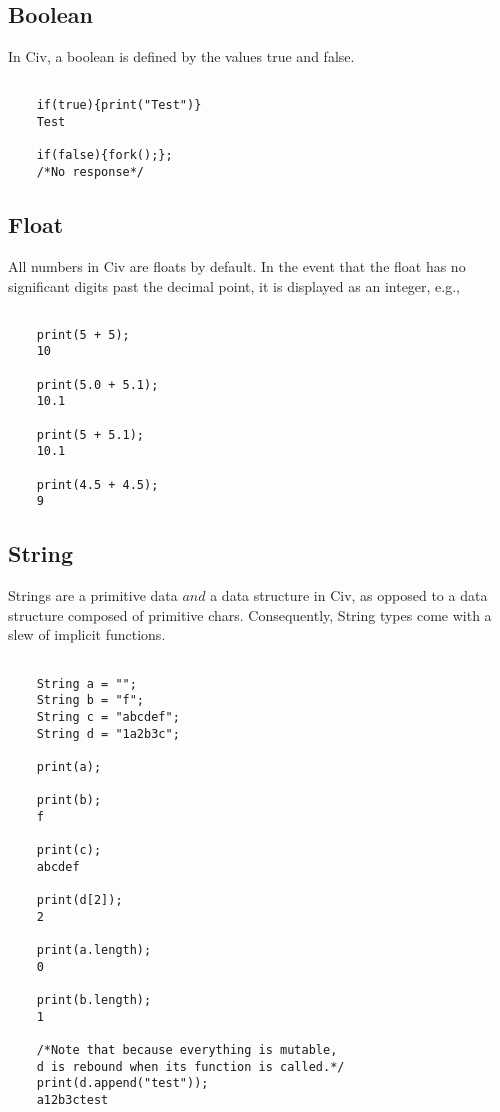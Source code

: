 \documentclass[a4paper]{article}
\begin{document}
\subsection{Boolean}
In Civ, a boolean is defined by the values {\selectfont true} and {\selectfont false}. 

{\selectfont
\begin{lstlisting} 
    
    if(true){print("Test")}
    Test
        
    if(false){fork();};
    /*No response*/

\end{lstlisting}
}

\subsection{Float}
All numbers in Civ are floats by default. In the event that the float has no significant digits past the decimal point, it is displayed as an integer, e.g.,

{\selectfont
\begin{lstlisting} 

    print(5 + 5);
    10
    
    print(5.0 + 5.1);
    10.1
    
    print(5 + 5.1);
    10.1
    
    print(4.5 + 4.5);
    9

\end{lstlisting}
}

\subsection{String}
Strings are a primitive data $and$ a data structure in Civ, as opposed to a data structure composed of primitive chars. Consequently, String types come with a slew of implicit functions.

{\selectfont
\begin{lstlisting}

    String a = "";
    String b = "f";
    String c = "abcdef";
    String d = "1a2b3c";
    
    print(a);
    
    print(b);
    f
    
    print(c);
    abcdef
    
    print(d[2]);
    2
    
    print(a.length);
    0
    
    print(b.length);
    1
    
    /*Note that because everything is mutable,
    d is rebound when its function is called.*/
    print(d.append("test"));
    a12b3ctest
	
\end{lstlisting}
}
\end{document}
